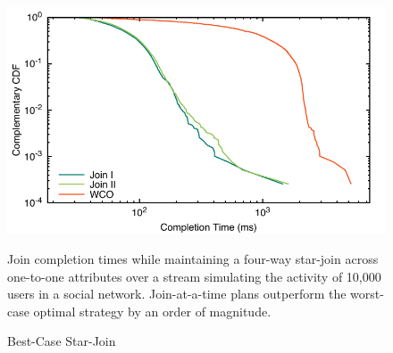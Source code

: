 \documentclass[../catalog.tex]{subfiles}
\begin{document}
\begin{figure}
  \centering
  \includegraphics[width=1.0\linewidth]{results/best_case/out/all_cdfs}
  \caption{Best-Case Star-Join}
  \label{fig:best-case-cdfs}
  \medskip
  \small

  Join completion times while maintaining a four-way star-join across
  one-to-one attributes over a stream simulating the activity of
  10,000 users in a social network. Join-at-a-time plans outperform
  the worst-case optimal strategy by an order of magnitude.
\end{figure}
\end{document}
